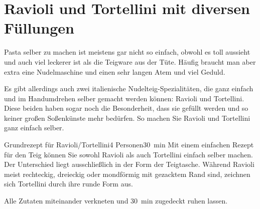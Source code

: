 \section{Ravioli und Tortellini mit diversen Füllungen}
Pasta selber zu machen ist meistens gar nicht so einfach, obwohl es toll aussieht und auch viel leckerer ist als die Teigware aus der Tüte. Häufig braucht man aber extra eine Nudelmaschine und einen sehr langen Atem und viel Geduld.

Es gibt allerdings auch zwei italienische Nudelteig-Spezialitäten, die ganz einfach und im Handumdrehen selber gemacht werden können: Ravioli und Tortellini. Diese beiden haben sogar noch die Besonderheit, dass sie gefüllt werden und so keiner großen Soßenkünste mehr bedürfen. So machen Sie Ravioli und Tortellini ganz einfach selber.\autocite{fuersie_2021}

\begin{recipe}{Grundrezept für Ravioli/Tortellini}{4 Personen}{\SI{30}{\minute}}
    \freeform Mit einem einfachen Rezept für den Teig können Sie sowohl Ravioli als auch Tortellini einfach selber machen. Der Unterschied liegt ausschließlich in der Form der Teigtasche. Während Ravioli meist rechteckig, dreieckig oder mondförmig mit gezacktem Rand sind, zeichnen sich Tortellini durch ihre runde Form aus.

    Alle Zutaten miteinander verkneten und \SI{30}{\minute} zugedeckt ruhen lassen.
    \freeform\hrulefill
\end{recipe}

